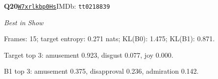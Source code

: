 \par\noindent\begin{minipage}{\textwidth}\small
\textbf{Q20}\quad\href{https://www.youtube.com/watch?v=W7xrlkbp0Hs}{\texttt{W7xrlkbp0Hs}}\quad IMDb: \texttt{tt0218839}\par
\textit{Best in Show}\par
Frames: 15; target entropy: 0.271 nats; KL(B0): 1.475; KL(B1): 0.871.\par
Target top 3: amusement 0.923, disgust 0.077, joy 0.000.\par
B1 top 3: amusement 0.375, disapproval 0.236, admiration 0.142.\par
\end{minipage}\par\medskip
